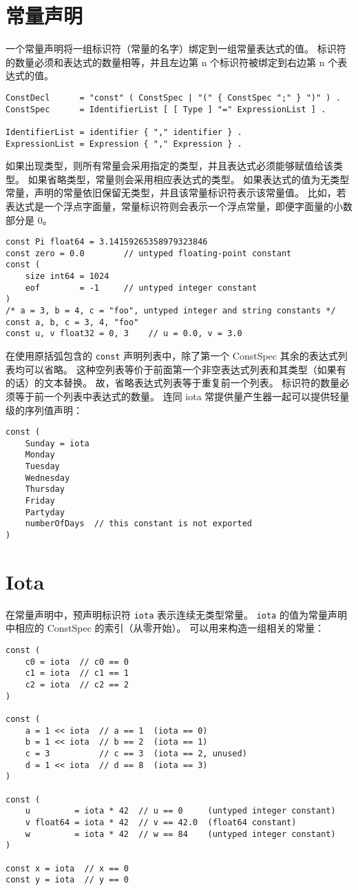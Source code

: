 \section{常量声明}
一个常量声明将一组标识符（常量的名字）绑定到一组常量表达式的值。
标识符的数量必须和表达式的数量相等，并且左边第 n 个标识符被绑定到右边第 n 个表达式的值。
\begin{lstlisting}[style=EBNF]
ConstDecl      = "const" ( ConstSpec | "(" { ConstSpec ";" } ")" ) .
ConstSpec      = IdentifierList [ [ Type ] "=" ExpressionList ] .

IdentifierList = identifier { "," identifier } .
ExpressionList = Expression { "," Expression } .
\end{lstlisting}
如果出现类型，则所有常量会采用指定的类型，并且表达式必须能够赋值给该类型。
如果省略类型，常量则会采用相应表达式的类型。
如果表达式的值为无类型常量，声明的常量依旧保留无类型，并且该常量标识符表示该常量值。
比如，若表达式是一个浮点字面量，常量标识符则会表示一个浮点常量，即便字面量的小数部分是 0。
\begin{lstlisting}[style=golang]
const Pi float64 = 3.14159265358979323846
const zero = 0.0        // untyped floating-point constant
const (
	size int64 = 1024
	eof        = -1  	// untyped integer constant
)
/* a = 3, b = 4, c = "foo", untyped integer and string constants */
const a, b, c = 3, 4, "foo"  
const u, v float32 = 0, 3    // u = 0.0, v = 3.0
\end{lstlisting}
在使用原括弧包含的 \lstinline|const| 声明列表中，除了第一个 ConstSpec 其余的表达式列表均可以省略。
这种空列表等价于前面第一个非空表达式列表和其类型（如果有的话）的文本替换。
故，省略表达式列表等于重复前一个列表。
标识符的数量必须等于前一个列表中表达式的数量。
连同 iota 常提供量产生器一起可以提供轻量级的序列值声明：
\begin{lstlisting}[style=golang]
const (
	Sunday = iota
	Monday
	Tuesday
	Wednesday
	Thursday
	Friday
	Partyday
	numberOfDays  // this constant is not exported
)
\end{lstlisting}

\section{Iota}
在常量声明中，预声明标识符 \lstinline|iota| 表示连续无类型常量。
\lstinline|iota| 的值为常量声明中相应的 ConstSpec 的索引（从零开始）。
可以用来构造一组相关的常量：
\begin{lstlisting}[style=golang]
const (
	c0 = iota  // c0 == 0
	c1 = iota  // c1 == 1
	c2 = iota  // c2 == 2
)

const (
	a = 1 << iota  // a == 1  (iota == 0)
	b = 1 << iota  // b == 2  (iota == 1)
	c = 3          // c == 3  (iota == 2, unused)
	d = 1 << iota  // d == 8  (iota == 3)
)

const (
	u         = iota * 42  // u == 0     (untyped integer constant)
	v float64 = iota * 42  // v == 42.0  (float64 constant)
	w         = iota * 42  // w == 84    (untyped integer constant)
)

const x = iota  // x == 0
const y = iota  // y == 0
\end{lstlisting}

